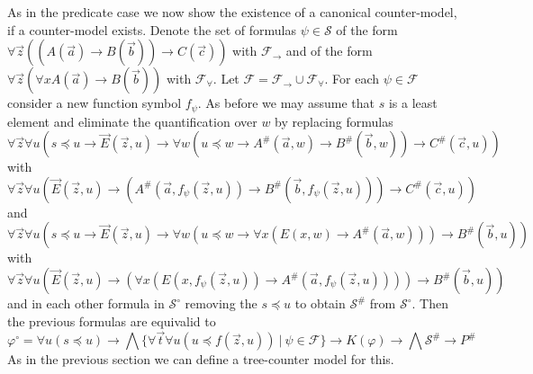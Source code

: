 \documentclass[a4paper,UKenglish,cleveref, autoref, thm-restate]{lipics-v2021}
\begin{document}
As in the predicate case we now show the existence of a canonical counter-model, if a counter-model exists. Denote the set of formulas $\psi\in\mathcal S$ of the form $\forall\vec z((A(\vec a)\to B(\vec b))\to C(\vec c))$ with $\mathcal F_\to$ and of the form $\forall \vec z(\forall xA(\vec a)\to B(\vec b))$ with $\mathcal F_\forall$. Let $\mathcal F = \mathcal F_\to\cup\mathcal F_\forall$. For each  $\psi\in\mathcal F$ consider a new function symbol $f_\psi$. As before we may assume that $s$ is a least element and eliminate the quantification over $w$ by replacing formulas
$$\forall \vec z\forall u(s\preceq u\to\vec E(\vec z, u)\to \forall w(u\preceq w\to A^\#(\vec a, w)\to B^\#(\vec b, w))\to C^\#(\vec c, u))$$ with
$$\forall \vec z\forall u(\vec E(\vec z, u)\to (A^\#(\vec a, f_\psi(\vec z, u))\to B^\#(\vec b, f_\psi(\vec z, u)))\to C^\#(\vec c, u))$$ and
$$\forall \vec z\forall u(s\preceq u\to\vec E(\vec z, u)\to \forall w(u\preceq w\to \forall x(E(x, w)\to A^\#(\vec a, w)))\to B^\#(\vec b, u))$$ with $$\forall \vec z\forall u(\vec E(\vec z, u)\to (\forall x(E(x, f_\psi(\vec z, u))\to A^\#(\vec a, f_\psi(\vec z, u))))\to B^\#(\vec b, u))$$
and in each other formula in $\mathcal S^\circ$ removing the $s\preceq u$ to obtain $\mathcal S^\#$ from $\mathcal S^\circ$. Then the previous formulas are equivalid to
$$\varphi^\circ= \forall u(s\preceq u)\to \bigwedge\{\forall \vec t\forall u(u\preceq f(\vec z, u))\:|\:\psi\in\mathcal F\}\to K(\varphi)\to\bigwedge\mathcal S^\#\to P^\#$$
As in the previous section we can define a tree-counter model for this.
\end{document}
